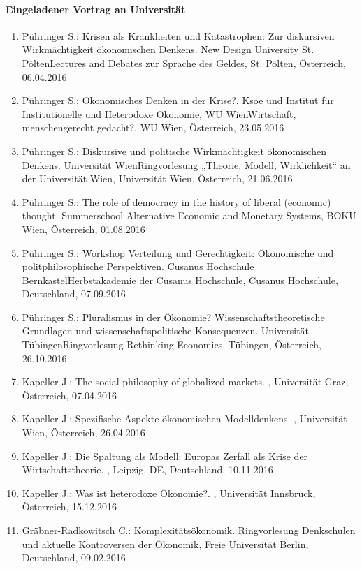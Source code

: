 \paragraph{Eingeladener Vortrag an Universität}
\begin{enumerate}
	\item Pühringer S.: Krisen als Krankheiten und Katastrophen: Zur diskursiven Wirkmächtigkeit ökonomischen Denkens. New Design University St. PöltenLectures and Debates zur \glqq Sprache des Geldes\grqq{}, St. Pölten, Österreich, 06.04.2016
	\item Pühringer S.: Ökonomisches Denken in der Krise?. Ksoe und Institut für Institutionelle und Heterodoxe Ökonomie, WU WienWirtschaft, menschengerecht gedacht?, WU Wien, Österreich, 23.05.2016
	\item Pühringer S.: Diskursive und politische Wirkmächtigkeit ökonomischen Denkens. Universität WienRingvorlesung „Theorie, Modell, Wirklichkeit“ an der Universität Wien, Universität Wien, Österreich, 21.06.2016
	\item Pühringer S.: The role of democracy in the history of liberal (economic) thought. Summerschool Alternative Economic and Monetary Systems, BOKU Wien, Österreich, 01.08.2016
	\item Pühringer S.: Workshop Verteilung und Gerechtigkeit: Ökonomische und politphilosophische Perspektiven. Cusanus Hochschule BernkastelHerbstakademie der Cusanus Hochschule, Cusanus Hochschule, Deutschland, 07.09.2016
	\item Pühringer S.: Pluralismus in der Ökonomie? Wissenschaftstheoretische Grundlagen und wissenschaftspolitische Konsequenzen. Universität TübingenRingvorlesung \glqq Rethinking Economics\grqq{}, Tübingen, Österreich, 26.10.2016
	\item Kapeller J.: The social philosophy of globalized markets. , Universität Graz, Österreich, 07.04.2016
	\item Kapeller J.: Spezifische Aspekte ökonomischen Modelldenkens. , Universität Wien, Österreich, 26.04.2016
	\item Kapeller J.: Die Spaltung als Modell: Europas Zerfall als Krise der Wirtschaftstheorie. , Leipzig, DE, Deutschland, 10.11.2016
	\item Kapeller J.: Was ist heterodoxe Ökonomie?. , Universität Innsbruck, Österreich, 15.12.2016
	\item Gräbner-Radkowitsch C.: Komplexitätsökonomik. Ringvorlesung \glqq Denkschulen und aktuelle Kontroversen der Ökonomik\grqq{}, Freie Universität Berlin, Deutschland, 09.02.2016

\end{enumerate}
